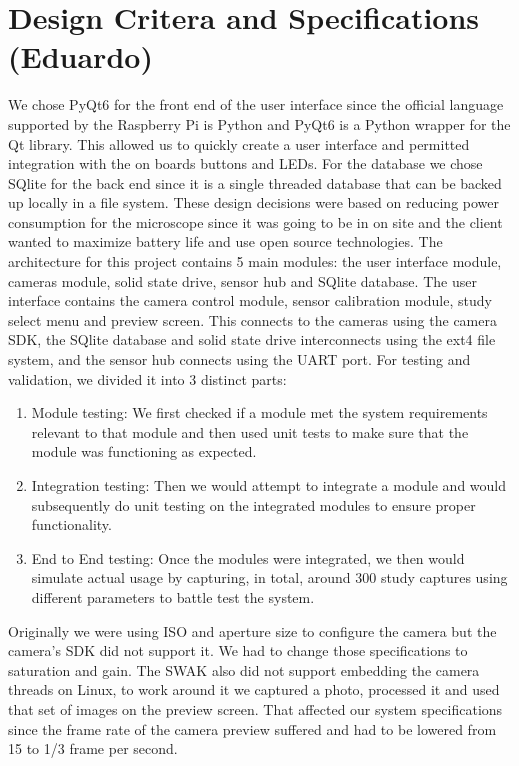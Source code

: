 \section{Design Critera and Specifications (Eduardo)}
We chose PyQt6 for the front end of the user interface since the official language supported by the Raspberry Pi is Python and PyQt6 is a Python wrapper for the Qt library. This allowed us to quickly create a user interface and permitted integration with the on boards buttons and LEDs. For the database we chose SQlite for the back end since it is a single threaded database that can be backed up locally in a file system. These design decisions were based on reducing power consumption for the microscope since it was going to be in on site and the client wanted to maximize battery life and use open source technologies. The architecture for this project contains 5 main modules: the user interface module, cameras module, solid state drive, sensor hub and SQlite database. The user interface contains the camera control module, sensor calibration module, study select menu and preview screen. This connects to the cameras using the camera SDK, the SQlite database and solid state drive interconnects using the ext4 file system, and the sensor hub connects using the UART port. For testing and validation, we divided it into 3 distinct parts:
\begin{enumerate}
	\item Module testing: We first checked if a module met the system requirements relevant to that module and then used unit tests to make sure that the module was functioning as expected.
	\item Integration testing: Then we would attempt to integrate a module and would subsequently do unit testing on the integrated modules to ensure proper functionality.
	\item End to End testing: Once the modules were integrated, we then would simulate actual usage by capturing, in total, around 300 study captures using different parameters to battle test the system.
\end{enumerate}
Originally we were using ISO and aperture size to configure the camera but the camera's SDK did not support it. We had to change those specifications to saturation and gain. The SWAK also did not support embedding the camera threads on Linux, to work around it we captured a photo, processed it and used that set of images on the preview screen. That affected our system specifications since the frame rate of the camera preview suffered and had to be lowered from 15 to 1/3 frame per second. \\
